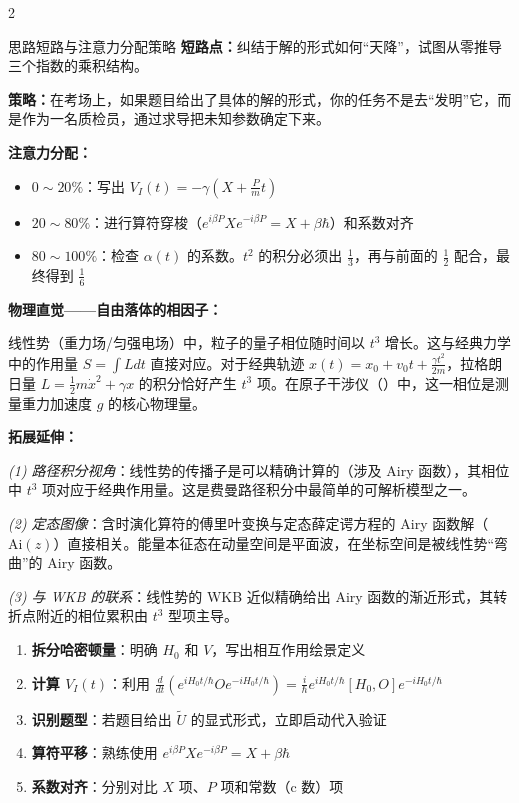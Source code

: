 \begin{multicols}{2}
\begin{errorbox}[colback=white]{思路短路与注意力分配策略}
\textbf{短路点：}纠结于解的形式如何``天降''，试图从零推导三个指数的乘积结构。

\textbf{策略：}在考场上，如果题目给出了具体的解的形式，你的任务不是去``发明''它，而是作为一名质检员，通过求导把未知参数确定下来。

\textbf{注意力分配：}
\begin{itemize}[nosep]
    \item $0\sim20\%$：写出 $V_I(t) = -\gamma(X + \frac{P}{m}t)$
    \item $20\sim80\%$：进行算符穿梭（$e^{i\beta P} X e^{-i\beta P} = X + \beta\hbar$）和系数对齐
    \item $80\sim100\%$：检查 $\alpha(t)$ 的系数。$t^2$ 的积分必须出 $\frac{1}{3}$，再与前面的 $\frac{1}{2}$ 配合，最终得到 $\frac{1}{6}$
\end{itemize}
\end{errorbox}

\begin{insightbox}[举一反三与物理直觉]
\textbf{物理直觉——自由落体的相因子：}

线性势（重力场/匀强电场）中，粒子的量子相位随时间以 $t^3$ 增长。这与经典力学中的作用量 $S = \int L dt$ 直接对应。对于经典轨迹 $x(t) = x_0 + v_0 t + \frac{\gamma t^2}{2m}$，拉格朗日量 $L = \frac{1}{2}m\dot{x}^2 + \gamma x$ 的积分恰好产生 $t^3$ 项。在原子干涉仪（）中，这一相位是测量重力加速度 $g$ 的核心物理量。

\textbf{拓展延伸：}

\textit{(1) 路径积分视角}：线性势的传播子是可以精确计算的（涉及 Airy 函数），其相位中 $t^3$ 项对应于经典作用量。这是费曼路径积分中最简单的可解析模型之一。

\textit{(2) 定态图像}：含时演化算符的傅里叶变换与定态薛定谔方程的 Airy 函数解（$\text{Ai}(z)$）直接相关。能量本征态在动量空间是平面波，在坐标空间是被线性势``弯曲''的 Airy 函数。

\textit{(3) 与 WKB 的联系}：线性势的 WKB 近似精确给出 Airy 函数的渐近形式，其转折点附近的相位累积由 $t^3$ 型项主导。
\end{insightbox}

\begin{thinkbox}
\begin{enumerate}
    \item \textbf{拆分哈密顿量}：明确 $H_0$ 和 $V$，写出相互作用绘景定义
    \item \textbf{计算 $V_I(t)$}：利用 $\frac{d}{dt}(e^{iH_0 t/\hbar} O e^{-iH_0 t/\hbar}) = \frac{i}{\hbar}e^{iH_0 t/\hbar}[H_0, O]e^{-iH_0 t/\hbar}$
    \item \textbf{识别题型}：若题目给出 $\tilde{U}$ 的显式形式，立即启动代入验证
    \item \textbf{算符平移}：熟练使用 $e^{i\beta P} X e^{-i\beta P} = X + \beta\hbar$
    \item \textbf{系数对齐}：分别对比 $X$ 项、$P$ 项和常数（c 数）项
\end{enumerate}
\end{thinkbox}

\end{multicols}

